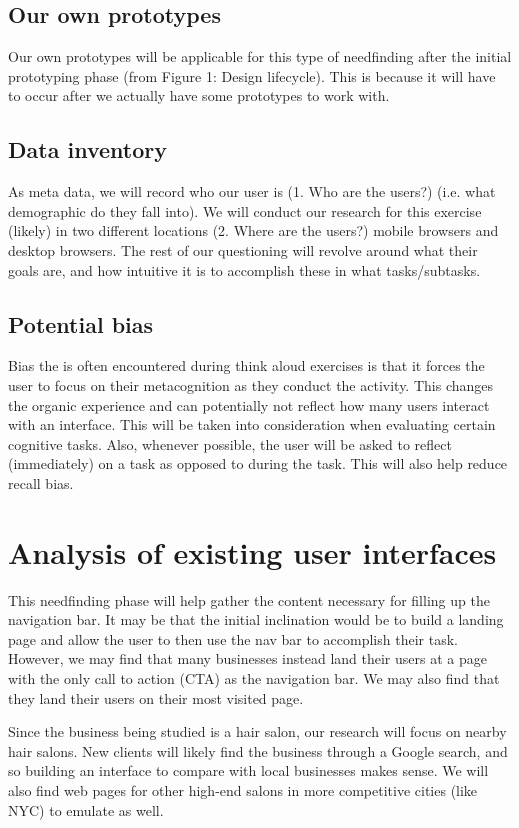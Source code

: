 \subsection{Our own prototypes}
Our own prototypes will be applicable for this type of needfinding after the initial prototyping phase (from Figure 1: Design lifecycle). This is because it will have to occur after we actually have some prototypes to work with.

\subsection{Data inventory}
As meta data, we will record who our user is (1. Who are the users?) (i.e. what demographic do they fall into). We will conduct our research for this exercise (likely) in two different locations (2. Where are the users?) mobile browsers and desktop browsers. The rest of our questioning will revolve around what their goals are, and how intuitive it is to accomplish these in what tasks/subtasks.

\subsection{Potential bias}
Bias the is often encountered during think aloud exercises is that it forces the user to focus on their metacognition as they conduct the activity. This changes the organic experience and can potentially not reflect how many users interact with an interface. This will be taken into consideration when evaluating certain cognitive tasks. Also, whenever possible, the user will be asked to reflect (immediately) on a task as opposed to during the task. This will also help reduce recall bias.

\section{Analysis of existing user interfaces}

This needfinding phase will help gather the content necessary for filling up the navigation bar. It may be that the initial inclination would be to build a landing page and allow the user to then use the nav bar to accomplish their task. However, we may find that many businesses instead land their users at a page with the only call to action (CTA) as the navigation bar. We may also find that they land their users on their most visited page.

Since the business being studied is a hair salon, our research will focus on nearby hair salons. New clients will likely find the business through a Google search, and so building an interface to compare with local businesses makes sense. We will also find web pages for other high-end salons in more competitive cities (like NYC) to emulate as well.

